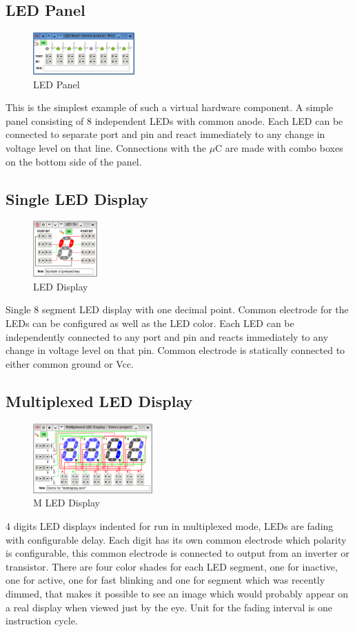 \documentclass[a4paper,twoside,12pt]{book}
\newcommand{\uC}{$\mu$C }
\begin{document}
		\subsection{LED Panel}
			\begin{figure}
				\centering{}
				\includegraphics[width=110pt]{img/015.png}
				\caption{LED Panel}
			\end{figure}
			This is the simplest example of such a virtual hardware component. A simple panel consisting of 8 independent LEDs with common anode. Each LED can be connected to separate port and pin and react immediately to any change in voltage level on that line. Connections with the \uC are made with combo boxes on the bottom side of the panel.

		\subsection{Single LED Display}
			\begin{figure}
				\centering{}
				\includegraphics[width=70pt]{img/012.png}
				\caption{LED Display}
			\end{figure}
			Single 8 segment LED display with one decimal point. Common electrode for the LEDs can be configured as well as the LED color. Each LED can be independently connected to any port and pin and reacts immediately to any change in voltage level on that pin. Common electrode is statically connected to either common ground or Vcc.

		\subsection{Multiplexed LED Display}
			\begin{figure}
				\centering{}
				\includegraphics[width=130pt]{img/011.png}
				\caption{M LED Display}
			\end{figure}
			4 digits LED displays indented for run in multiplexed mode, LEDs are fading with configurable delay. Each digit has its own common electrode which polarity is configurable, this common electrode is connected to output from an inverter or transistor. There are four color shades for each LED segment, one for inactive, one for active, one for fast blinking and one for segment which was recently dimmed, that makes it possible to see an image which would probably appear on a real display when viewed just by the eye. Unit for the fading interval is one instruction cycle.
		\clearpage
\end{document}
